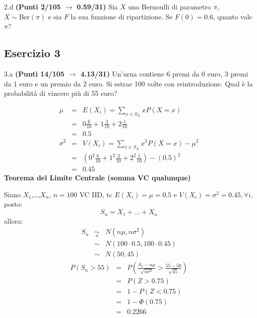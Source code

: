 \documentclass[
  11pt,
]{book}
\theoremstyle{mytheoremstyle}
\theoremstyle{mydefstyle}
\newenvironment{sol}
  {
  \begin{tcolorbox}[enhanced,breakable,arc=0.1mm,boxrule=1pt,colback=white,colframe=iblue,
  title=\bf \fontfamily{lmss}\selectfont \hspace{.5 cm} Soluzione,drop fuzzy shadow]

}{
\end{tcolorbox}
  }
\begin{document}
2.d \textbf{(Punti 2/105 \(\rightarrow\) 0.59/31)} Sia \(X\) una Bernoulli di parametro \(\pi\), \(X\sim\text{Ber}(\pi)\) e sia \(F\) la sua funzione di ripartizione. Se \(F(0)=0.6\), quanto vale \(\pi\)?

\subsection{Esercizio 3}\label{esercizio-3-36}

3.a \textbf{(Punti 14/105 \(\rightarrow\) 4.13/31)} Un'urna contiene 6 premi da \(\mbox{0}\) euro, 3 premi da \(\mbox{1}\) euro e un premio da \(\mbox{2}\) euro.
Si estrae 100 volte con reintroduzione.
Qual è la probabilità di vincere più di 55 euro?

\begin{sol}
\begin{eqnarray*} \mu &=& E(X_i) = \sum_{x\in S_X}x P(X=x)\\ 
 &=&  0  \frac { 6 }{ 10 }+ 1  \frac { 3 }{ 10 }+ 2  \frac { 1 }{ 10 } \\ 
            &=& 0.5 \\ 
 \sigma^2 &=& V(X_i) = \sum_{x\in S_X}x^2 P(X=x)-\mu^2\\ 
 &=&\left(  0  ^2\frac { 6 }{ 10 }+ 1  ^2\frac { 3 }{ 10 }+ 2  ^2\frac { 1 }{ 10 } \right)-( 0.5 )^2\\ 
            &=& 0.45 
\end{eqnarray*}
\textbf{Teorema del Limite Centrale (somma VC qualunque)}

Siano \(X_1\),\ldots,\(X_n\), \(n=100\) VC IID, tc \(E(X_i)=\mu=0.5\) e \(V(X_i)=\sigma^2=0.45,\forall i\), posto:
\[
      S_n = X_1 + ... + X_n
      \]
allora:\begin{eqnarray*}
  S_n & \mathop{\sim}\limits_{a}& N(n\mu,n\sigma^2) \\
     &\sim & N(100\cdot0.5,100\cdot0.45) \\
     &\sim & N(50,45) 
  \end{eqnarray*}\begin{eqnarray*}
      P( S_n   >   55 ) 
        &=& P\left(  \frac { S_n  -  n\mu }{ \sqrt{n\sigma^2} }  >  \frac { 55  -  50 }{\sqrt{ 45 }} \right)  \\
                 &=& P\left(  Z   >   0.75 \right) \\    &=& 1-P(Z< 0.75 )\\ 
                 &=&  1-\Phi( 0.75 ) \\ &=&  0.2266 
      \end{eqnarray*}

\end{sol}
\end{document}
